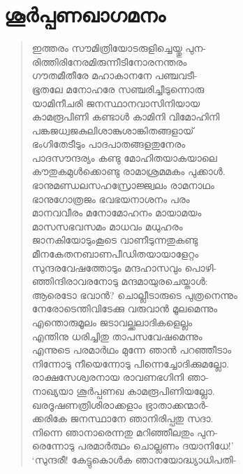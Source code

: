 \section{ശൂര്‍പ്പണഖാഗമനം}

\begin{verse}
ഇത്തരം സൗമിത്രിയോടരുളിച്ചെയ്തു പുന-\\
രിത്തിരിനേരമിരുന്നീടിനോരനന്തരം\\
ഗൗതമീതീരേ മഹാകാനനേ പഞ്ചവടീ-\\
ഭൂതലേ മനോഹരേ സഞ്ചരിച്ചീടുന്നൊരു\\
യാമിനീചരി ജനസ്ഥാനവാസിനിയായ\\
കാമരൂപിണി കണ്ടാള്‍ കാമിനി വിമോഹിനി\\
പങ്കജധ്വജകുലിശാങ്കുശാങ്കിതങ്ങളായ്\\
ഭംഗിതേടീടും പാദപാതങ്ങളതുനേരം\\
പാദസൗന്ദര്യം കണ്ടു മോഹിതയാകയാലെ\\
കൗതുകമുള്‍ക്കൊണ്ടു രാമാശ്രമമകം പുക്കാള്‍.\\
ഭാനുമണ്ഡലസഹസ്രോജ്ജ്വലം രാമനാഥം\\
ഭാനുഗോത്രജം ഭവഭയനാശനം പരം\\
മാനവവീരം മനോമോഹനം മായാമയം\\
മാസസഭവസമം മാധവം മധുഹരം\\
ജാനകിയോടുംകൂടെ വാണീടുന്നതുകണ്ടു\\
മീനകേതനബാണപീഡിതയായാളേറ്റം\\
സുന്ദരവേഷത്തോടും മന്ദഹാസവും പൊഴി-\\
ഞ്ഞിന്ദിരാവരനോടു മന്ദമായുരചെയ്താള്‍:\\
ആരെടോ ഭവാന്‍? ചൊല്ലീടാരുടെ പുത്രനെന്നും\\
നേരോടെന്തിവിടേക്കു വരുവാന്‍ മൂലമെന്നും\\
എന്തൊരുമൂലം ജടാവല്ക്കലാദികളെല്ലം\\
എന്തിനു ധരിച്ചിതു താപസവേഷമെന്നും\\
എന്നുടെ പരമാര്‍ഥം മുന്നേ ഞാന്‍ പറഞ്ഞീടാം\\
നിന്നോടു നീയെന്നോടു പിന്നെച്ചോദിക്കുമല്ലോ.\\
രാക്ഷസേശ്വരനായ രാവണഭഗിനി ഞാ-\\
നാഖ്യയാ ശൂര്‍പ്പണഖ കാമരൂപിണിയല്ലോ.\\
ഖരദൂഷണത്രിശിരാക്കളാം ഭ്രാതാക്കന്മാര്‍-\\
ക്കരികേ ജനസ്ഥാനേ ഞാനിരിപ്പതു സദാ.\\
നിന്നെ ഞാനാരെന്നതു മറിഞ്ഞീലതും പുന-\\
രെന്നോടു പരമാര്‍ത്ഥം ചൊല്ലണം ദയാനിധേ!’\\
‘സുന്ദരീ! കേട്ടുകൊള്‍ക ഞാനയോദ്ധ്യാധിപതി-\\

\end{verse}
